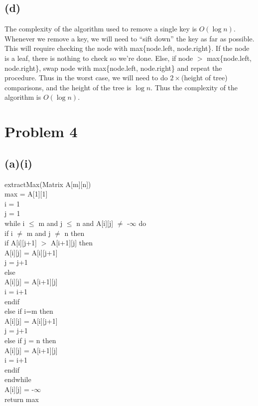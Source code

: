 \documentclass{article}[12pt]
\begin{document}
\subsection*{(d)}
The complexity of the algorithm used to remove a single key is $O(\log n)$. \\
Whenever we remove a key, we will need to ``sift down'' the key as far as possible. This will require checking the node with max\{node.left, node.right\}. If the node is a leaf, there is nothing to check so we're done. Else, if node $>$ max\{node.left, node.right\}, swap node with max\{node.left, node.right\} and repeat the procedure. Thus in the worst case, we will need to do $2\times$(height of tree) comparisons, and the height of the tree is $\log n$. Thus the complexity of the algorithm is $O(\log n)$.

\section*{Problem 4}
\subsection*{(a)(i)}
extractMax(Matrix A[m][n]) \\
  \indent max = A[1][1] \\
  \indent i = 1 \\
  \indent j = 1 \\
  \indent while i $\leq$ m and j $\leq$ n and A[i][j] $\neq$ -$\infty$ do \\
  \indent \indent if i $\neq$ m and j $\neq$ n then \\
  \indent \indent \indent if A[i][j+1] $>$ A[i+1][j] then \\
  \indent \indent \indent \indent A[i][j] = A[i][j+1] \\
  \indent \indent \indent \indent j = j+1 \\
  \indent \indent \indent else  \\
  \indent \indent \indent \indent A[i][j] = A[i+1][j] \\
  \indent \indent \indent \indent i = i+1 \\
  \indent \indent \indent endif \\
  \indent \indent else if i=m then \\
  \indent \indent \indent A[i][j] = A[i][j+1] \\
  \indent \indent \indent j = j+1 \\
  \indent \indent else if j = n then \\
  \indent \indent \indent A[i][j] = A[i+1][j] \\
  \indent \indent \indent i = i+1 \\
  \indent \indent endif \\
  \indent endwhile \\
  \indent A[i][j] = -$\infty$ \\
  \indent return max \\ \\
\end{document}

